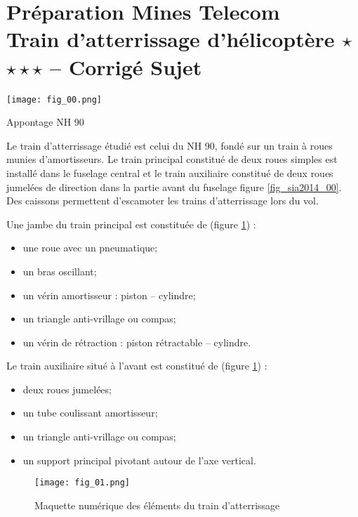 \chapter*{Préparation Mines Telecom \\%
Train d'atterrissage d'hélicoptère \ifnormal $\star$ \else \fi \iftdifficile $\star\star\star$ \else \fi  -- 
\ifprof Corrigé \else Sujet \fi}

\iflivret {} \else
\ifprof  {} \else \fi
\fi

\setcounter{question}{0}


\begin{marginfigure}
\texttt{[image: fig\_00.png]}
\caption{Appontage NH 90 \label{fig_sia2014_00}}
\end{marginfigure}


Le train d'atterrissage étudié est celui du NH 90, fondé sur un train à roues munies d'amortisseurs.  
Le train principal constitué de deux roues simples est installé dans le fuselage central et le train auxiliaire constitué de deux roues jumelées de direction dans la partie avant du fuselage figure \ref{fig_sia2014_00}. 
Des caissons permettent d'escamoter les trains d'atterrissage lors du vol. 

\begin{multicols}{2}
Une jambe du train principal est constituée de (figure \ref{fig_sia2014_01}) : 
\begin{itemize}
\item une roue avec un pneumatique;
\item un bras oscillant;
\item un vérin amortisseur : piston – cylindre;
\item un triangle anti-vrillage ou compas;
\item un vérin de rétraction : piston rétractable – cylindre. 
\end{itemize}

Le train auxiliaire situé à l'avant est constitué de (figure \ref{fig_sia2014_01}) : 
\begin{itemize}
\item deux roues jumelées;
\item un tube coulissant amortisseur;
\item un triangle anti-vrillage ou compas;
\item un support principal pivotant autour de l'axe vertical.
\end{itemize}
\end{multicols}

\begin{figure}[!h]
\centering
\texttt{[image: fig\_01.png]}
\caption{Maquette numérique des éléments du train d'atterrissage \label{fig_sia2014_01}}
\end{figure}

